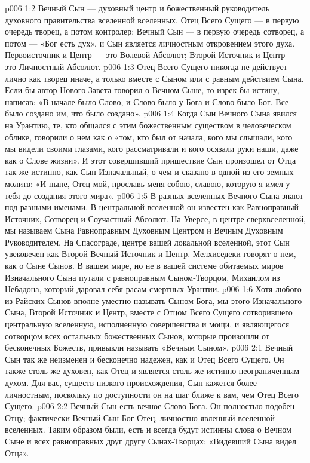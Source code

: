 \vs p006 1:2 Вечный Сын --- духовный центр и божественный руководитель духовного правительства вселенной вселенных. Отец Всего Сущего --- в первую очередь творец, а потом контролер; Вечный Сын --- в первую очередь сотворец, а потом ---  «Бог есть дух», и Сын является личностным откровением этого духа. Первоисточник и Центр --- это Волевой Абсолют; Второй Источник и Центр --- это Личностный Абсолют.
\vs p006 1:3 Отец Всего Сущего никогда не действует лично как творец иначе, а только вместе с Сыном или с равным действием Сына. Если бы автор Нового Завета говорил о Вечном Сыне, то изрек бы истину, написав: «В начале было Слово, и Слово было у Бога и Слово было Бог. Все было создано им, что было создано».
\vs p006 1:4 Когда Сын Вечного Сына явился на Урантию, те, кто общался с этим божественным существом в человеческом облике, говорили о нем как о «том, кто был от начала, кого мы слышали, кого мы видели своими глазами, кого рассматривали и кого осязали руки наши, даже как о Слове жизни». И этот совершивший пришествие Сын произошел от Отца так же истинно, как Сын Изначальный, о чем и сказано в одной из его земных молитв: «И ныне, Отец мой, прославь меня собою, славою, которую я имел у тебя до создания этого мира».
\vs p006 1:5 \pc В разных вселенных Вечного Сына знают под разными именами. В центральной вселенной он известен как Равноправный Источник, Сотворец и Соучастный Абсолют. На Уверсе, в центре сверхвселенной, мы называем Сына Равноправным Духовным Центром и Вечным Духовным Руководителем. На Спасограде, центре вашей локальной вселенной, этот Сын увековечен как Второй Вечный Источник и Центр. Мелхиседеки говорят о нем, как о Сыне Сынов. В вашем мире, но не в вашей системе обитаемых миров Изначального Сына путали с равноправным Сыном\hyp{}Творцом, Михаилом из Небадона, который даровал себя расам смертных Урантии.
\vs p006 1:6 Хотя любого из Райских Сынов вполне уместно называть Сыном Бога, мы этого Изначального Сына, Второй Источник и Центр, вместе с Отцом Всего Сущего сотворившего центральную вселенную, исполненную совершенства и мощи, и являющегося сотворцом всех остальных божественных Сынов, которые произошли от бесконечных Божеств, привыкли называть «Вечным Сыном».
\vs p006 2:1 Вечный Сын так же неизменен и бесконечно надежен, как и Отец Всего Сущего. Он также столь же духовен, как Отец и является столь же истинно неограниченным духом. Для вас, существ низкого происхождения, Сын кажется более личностным, поскольку по доступности он на шаг ближе к вам, чем Отец Всего Сущего.
\vs p006 2:2 Вечный Сын есть вечное Слово Бога. Он полностью подобен Отцу; фактически Вечный Сын  Бог Отец, личностно явленный вселенной вселенных. Таким образом были, есть и всегда будут истинны слова о Вечном Сыне и всех равноправных друг другу Сынах\hyp{}Творцах: «Видевший Сына видел Отца».
